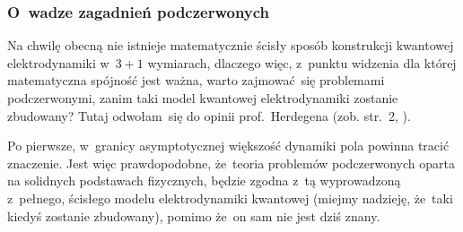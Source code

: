 \documentclass[10pt,t]{beamer}
\begin{document}







\begin{frame}
  \frametitle{O~wadze zagadnień podczerwonych}


  Na chwilę obecną nie istnieje matematycznie ścisły sposób konstrukcji
  kwantowej elektrodynamiki w~$3 + 1$ wymiarach, dlaczego więc, z~punktu
  widzenia dla której matematyczna spójność jest ważna, warto zajmować~się
  problemami podczerwonymi, zanim taki model kwantowej elektrodynamiki
  zostanie zbudowany? Tutaj odwołam~się do opinii prof.~Herdegena (zob.
  str.~2,
  \parencite{Herdegen-Semidirect-product-of-CCR-and-CAR-algebras-ETC-Pub-1998}).

  Po pierwsze, w~granicy asymptotycznej większość dynamiki pola
  powinna tracić znaczenie. Jest więc prawdopodobne, że~teoria problemów
  podczerwonych oparta na solidnych podstawach fizycznych, będzie zgodna
  z~tą wyprowadzoną z~pełnego, ścisłego modelu elektrodynamiki kwantowej
  (miejmy nadzieję, że~taki kiedyś zostanie zbudowany), pomimo że~on
  sam nie jest dziś znany.

\end{frame}
\end{document}
